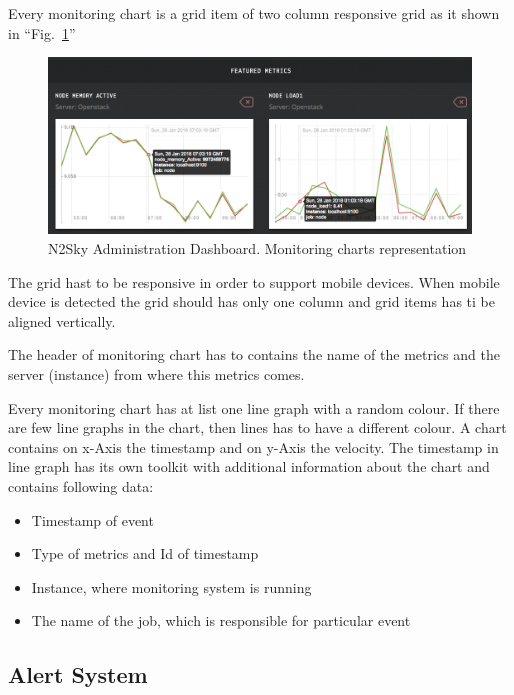 Every monitoring chart is a grid item of two column responsive grid as it shown in ``Fig.~\ref{fig:moniroting_representation}'' 

\begin{figure}[htbp]
\begin{center}
  \includegraphics[width=\linewidth]{components/4/pics/moniroting_representation.png}
  \caption{N2Sky Administration Dashboard. Monitoring charts representation}
  \label{fig:moniroting_representation}
\end{center}
\end{figure}

The grid hast to be responsive in order to support mobile devices. When mobile device is detected the grid should has only one column and grid items has ti be aligned vertically. 

The header of monitoring chart has to contains the name of the metrics and the server (instance) from where this metrics comes.

Every monitoring chart has at list one line graph with a random colour. If there are few line graphs in the chart, then lines has to have a different colour. A chart contains on x-Axis the timestamp and on y-Axis the velocity.  The timestamp in line graph has its own toolkit with additional information about the chart and contains following data:

\begin{itemize}
\item Timestamp of event
\item Type of metrics and Id of timestamp
\item Instance, where monitoring system is running
\item The name of the job, which is responsible for particular event
\end{itemize}


\subsection{Alert System}\label{Alerting System}

